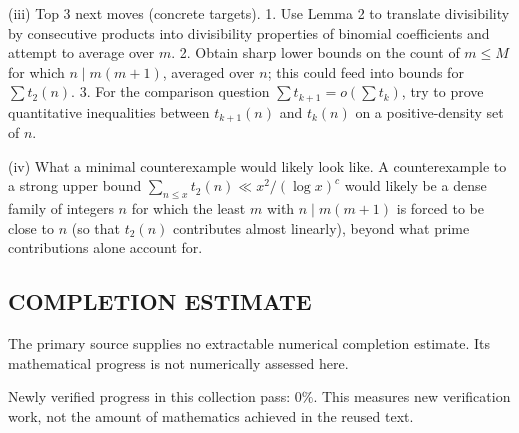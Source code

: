 (iii) Top 3 next moves (concrete targets).
1. Use Lemma 2 to translate divisibility by consecutive products into divisibility properties of binomial coefficients and attempt to average over $m$.
2. Obtain sharp lower bounds on the count of $m\le M$ for which $n\mid m(m+1)$, averaged over $n$; this could feed into bounds for $\sum t_2(n)$.
3. For the comparison question $\sum t_{k+1}=o(\sum t_k)$, try to prove quantitative inequalities between $t_{k+1}(n)$ and $t_k(n)$ on a positive-density set of $n$.

(iv) What a minimal counterexample would likely look like.
A counterexample to a strong upper bound $\sum_{n\le x}t_2(n)\ll x^2/(\log x)^c$ would likely be a dense family of integers $n$ for which the least $m$ with $n\mid m(m+1)$ is forced to be close to $n$ (so that $t_2(n)$ contributes almost linearly), beyond what prime contributions alone account for.




\subsection*{COMPLETION ESTIMATE}
The primary source supplies no extractable numerical completion estimate. Its mathematical progress is not numerically assessed here.

Newly verified progress in this collection pass: $0\%$. This measures new verification work, not the amount of mathematics achieved in the reused text.

